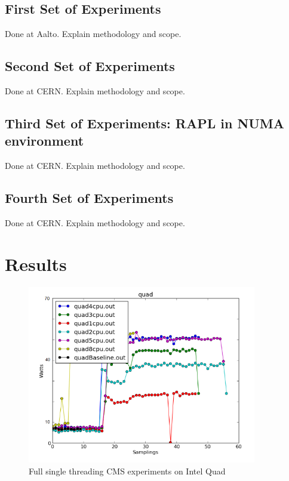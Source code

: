 \subsection{First Set of Experiments}
Done at Aalto. Explain methodology and scope.

\subsection{Second Set of Experiments}
Done at CERN. Explain methodology and scope.

\subsection{Third Set of Experiments: RAPL in NUMA environment}
Done at CERN. Explain methodology and scope.

\subsection{Fourth Set of Experiments}
Done at CERN. Explain methodology and scope.


\section{Results}

\begin{figure}[h!]
  \centering
    \includegraphics[width=100mm]{"img/aalto/aalto_total_quad"}
    \caption{Full single threading CMS experiments on Intel Quad}
    \label{fig:aalto_quad_clamp}
\end{figure}

